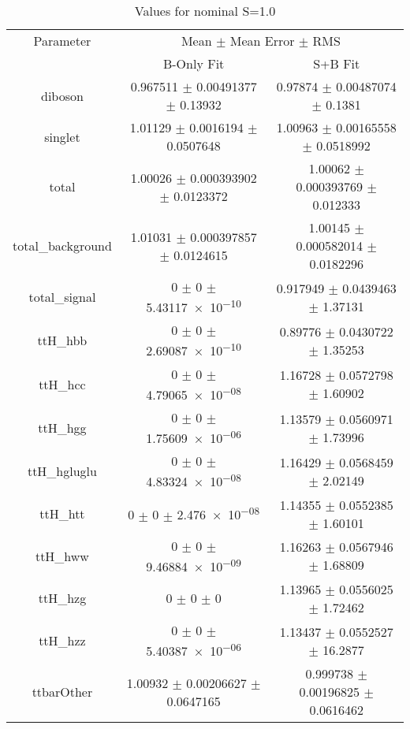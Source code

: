 \begin{table}
\centering
\caption{Values for nominal S=1.0}
\begin{tabular}{ccc}
\toprule
Parameter & \multicolumn{2}{c}{Mean $\pm$ Mean Error $\pm$ RMS}\\
 & B-Only Fit & S+B Fit\\
\midrule
diboson & \num{0.967511} $\pm$ \num{0.00491377} $\pm$ \num{0.13932} & \num{0.97874} $\pm$ \num{0.00487074} $\pm$ \num{0.1381}\\
singlet & \num{1.01129} $\pm$ \num{0.0016194} $\pm$ \num{0.0507648} & \num{1.00963} $\pm$ \num{0.00165558} $\pm$ \num{0.0518992}\\
total & \num{1.00026} $\pm$ \num{0.000393902} $\pm$ \num{0.0123372} & \num{1.00062} $\pm$ \num{0.000393769} $\pm$ \num{0.012333}\\
total\_background & \num{1.01031} $\pm$ \num{0.000397857} $\pm$ \num{0.0124615} & \num{1.00145} $\pm$ \num{0.000582014} $\pm$ \num{0.0182296}\\
total\_signal & \num{0} $\pm$ \num{0} $\pm$ \num{5.43117e-10} & \num{0.917949} $\pm$ \num{0.0439463} $\pm$ \num{1.37131}\\
ttH\_hbb & \num{0} $\pm$ \num{0} $\pm$ \num{2.69087e-10} & \num{0.89776} $\pm$ \num{0.0430722} $\pm$ \num{1.35253}\\
ttH\_hcc & \num{0} $\pm$ \num{0} $\pm$ \num{4.79065e-08} & \num{1.16728} $\pm$ \num{0.0572798} $\pm$ \num{1.60902}\\
ttH\_hgg & \num{0} $\pm$ \num{0} $\pm$ \num{1.75609e-06} & \num{1.13579} $\pm$ \num{0.0560971} $\pm$ \num{1.73996}\\
ttH\_hgluglu & \num{0} $\pm$ \num{0} $\pm$ \num{4.83324e-08} & \num{1.16429} $\pm$ \num{0.0568459} $\pm$ \num{2.02149}\\
ttH\_htt & \num{0} $\pm$ \num{0} $\pm$ \num{2.476e-08} & \num{1.14355} $\pm$ \num{0.0552385} $\pm$ \num{1.60101}\\
ttH\_hww & \num{0} $\pm$ \num{0} $\pm$ \num{9.46884e-09} & \num{1.16263} $\pm$ \num{0.0567946} $\pm$ \num{1.68809}\\
ttH\_hzg & \num{0} $\pm$ \num{0} $\pm$ \num{0} & \num{1.13965} $\pm$ \num{0.0556025} $\pm$ \num{1.72462}\\
ttH\_hzz & \num{0} $\pm$ \num{0} $\pm$ \num{5.40387e-06} & \num{1.13437} $\pm$ \num{0.0552527} $\pm$ \num{16.2877}\\
ttbarOther & \num{1.00932} $\pm$ \num{0.00206627} $\pm$ \num{0.0647165} & \num{0.999738} $\pm$ \num{0.00196825} $\pm$ \num{0.0616462}\\

\end{tabular}
\end{table}
